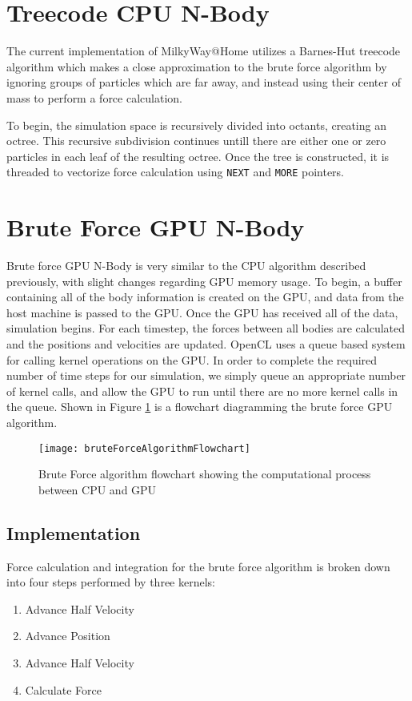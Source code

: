 \documentclass{thesis}
\begin{document}
\section{Treecode CPU N-Body}
The current implementation of MilkyWay@Home utilizes a Barnes-Hut treecode algorithm which makes a close approximation to the brute force algorithm by ignoring groups of particles which are far away, and instead using their center of mass to perform a force calculation.

To begin, the simulation space is recursively divided into octants, creating an octree. This recursive subdivision continues untill there are either one or zero particles in each leaf of the resulting octree. Once the tree is constructed, it is threaded to vectorize force calculation using \texttt{NEXT} and \texttt{MORE} pointers.
\section{Brute Force GPU N-Body}
Brute force GPU N-Body is very similar to the CPU algorithm described previously, with slight changes regarding GPU memory usage. To begin, a buffer containing all of the body information is created on the GPU, and data from the host machine is passed to the GPU. Once the GPU has received all of the data, simulation begins. For each timestep, the forces between all bodies are calculated and the positions and velocities are updated. OpenCL uses a queue based system for calling kernel operations on the GPU. In order to complete the required number of time steps for our simulation, we simply queue an appropriate number of kernel calls, and allow the GPU to run until there are no more kernel calls in the queue. Shown in Figure \ref{fig:GPUBruteForceAlg} is a flowchart diagramming the brute force GPU algorithm.

\begin{figure}[h]
    \caption{Brute Force algorithm flowchart showing the computational process between CPU and GPU}
    \label{fig:GPUBruteForceAlg}
    \centering
    \texttt{[image: bruteForceAlgorithmFlowchart]}
\end{figure}

\subsection{Implementation}
Force calculation and integration for the brute force algorithm is broken down into four steps performed by three kernels:
\begin{enumerate}[noitemsep]
    \item Advance Half Velocity
    \item Advance Position
    \item Advance Half Velocity
    \item Calculate Force
\end{enumerate}
\end{document}
